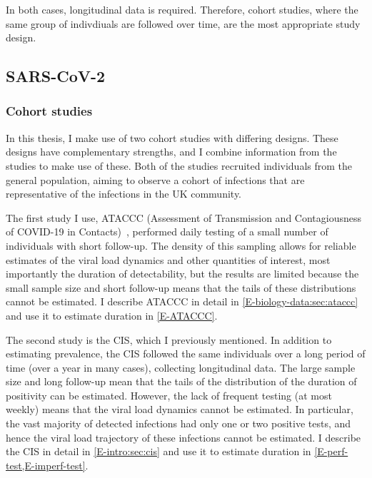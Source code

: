 \documentclass[thesis.tex]{subfiles}
\begin{document}
In both cases, longitudinal data is required.
Therefore, cohort studies, where the same group of indivdiuals are followed over time, are the most appropriate study design.

\subsection{SARS-CoV-2} \label{intro:sec:duration-SARS-CoV-2}

\subsubsection{Cohort studies}

In this thesis, I make use of two cohort studies with differing designs.
These designs have complementary strengths, and I combine information from the studies to make use of these.
Both of the studies recruited individuals from the general population, aiming to observe a cohort of infections that are representative of the infections in the UK community.

The first study I use, ATACCC (Assessment of Transmission and Contagiousness of COVID-19 in Contacts)~\autocite{singanayagamCommunity,hakkiOnset}, performed daily testing of a small number of individuals with short follow-up.
The density of this sampling allows for reliable estimates of the viral load dynamics and other quantities of interest, most importantly the duration of detectability, but the results are limited because the small sample size and short follow-up means that the tails of these distributions cannot be estimated.
I describe ATACCC in detail in \cref{E-biology-data:sec:ataccc} and use it to estimate duration in \cref{E-ATACCC}.

The second study is the CIS, which I previously mentioned.
In addition to estimating prevalence, the CIS followed the same individuals over a long period of time (over a year in many cases), collecting longitudinal data.
The large sample size and long follow-up mean that the tails of the distribution of the duration of positivity can be estimated.
However, the lack of frequent testing (at most weekly) means that the viral load dynamics cannot be estimated.
In particular, the vast majority of detected infections had only one or two positive tests, and hence the viral load trajectory of these infections cannot be estimated.
I describe the CIS in detail in \cref{E-intro:sec:cis} and use it to estimate duration in \cref{E-perf-test,E-imperf-test}.
\end{document}
